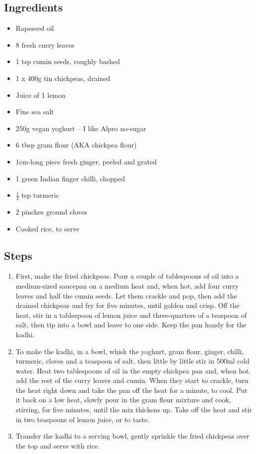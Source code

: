 \documentclass{book}
\begin{document}
\subsection*{Ingredients}
\begin{itemize}
\item Rapeseed oil 
\item 8 fresh curry leaves
\item 1 tsp cumin seeds, roughly bashed
\item 1 x 400g tin chickpeas, drained 
\item Juice of 1 lemon
\item Fine sea salt 
\item 250g vegan yoghurt – I like Alpro no-sugar 
\item 6 tbsp gram flour (AKA chickpea flour)
\item 1cm-long piece fresh ginger, peeled and grated 
\item 1 green Indian finger chilli, chopped 
\item $\frac{1}{4}$ tsp turmeric 
\item 2 pinches ground cloves 
\item Cooked rice, to serve
\end{itemize}

\subsection*{Steps}
\begin{enumerate}
\item First, make the fried chickpeas. Pour a couple of tablespoons of oil into a medium-sized saucepan on a medium heat and, when hot, add four curry leaves and half the cumin seeds. Let them crackle and pop, then add the drained chickpeas and fry for five minutes, until golden and crisp. Off the heat, stir in a tablespoon of lemon juice and three-quarters of a teaspoon of salt, then tip into a bowl and leave to one side. Keep the pan handy for the kadhi.
\item To make the kadhi, in a bowl, whisk the yoghurt, gram flour, ginger, chilli, turmeric, cloves and a teaspoon of salt, then little by little stir in 500ml cold water. Heat two tablespoons of oil in the empty chickpea pan and, when hot, add the rest of the curry leaves and cumin. When they start to crackle, turn the heat right down and take the pan off the heat for a minute, to cool. Put it back on a low heat, slowly pour in the gram flour mixture and cook, stirring, for five minutes, until the mix thickens up. Take off the heat and stir in two teaspoons of lemon juice, or to taste.
\item Transfer the kadhi to a serving bowl, gently sprinkle the fried chickpeas over the top and serve with rice.
\end{enumerate}
\newpage
\end{document}
